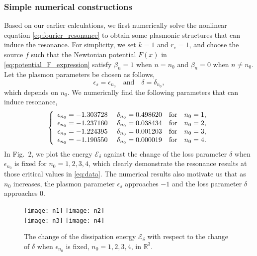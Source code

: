 \documentclass[11pt,reqno,twoside]{amsart}
\theoremstyle{definition}
\theoremstyle{remark}
\numberwithin{equation}{section}
\begin{document}
\subsubsection{Simple numerical constructions}

Based on our earlier calculations, we first numerically solve the nonlinear equation \eqref{eq:fourier_resonance} to obtain some plasmonic structures that can induce the resonance. For simplicity, we set $k=1$ and $r_e=1$, and choose the source $f$ such that the Newtonian potential $F(x)$ in \eqref{eq:potential_F_expression} satisfy $\beta_n=1$ when $n=n_0$ and $\beta_n=0$ when $n\neq n_0$. 
Let the plasmon parameters be chosen as follows,
\begin{equation}
  \epsilon_s=\epsilon_{n_0} \quad \mbox{and} \quad \delta=\delta_{n_0},
\end{equation}
which depends on $n_0$. We numerically find the following parameters that can induce resonance,
\begin{equation}\label{eq:data}
  \left\{
    \begin{array}{ll}
      \epsilon_{n_0}=-1.303728$ \quad $\delta_{n_0}=0.498620 & \mbox{for}\quad n_0=1, \\
      \epsilon_{n_0}=-1.237160$ \quad $\delta_{n_0}=0.038434 & \mbox{for}\quad n_0=2, \\
      \epsilon_{n_0}=-1.224395$ \quad $\delta_{n_0}=0.001203 & \mbox{for}\quad n_0=3, \\
      \epsilon_{n_0}=-1.190550$ \quad $\delta_{n_0}=0.000019 & \mbox{for}\quad n_0=4.
    \end{array}
  \right.
\end{equation}
In Fig.~2, we plot the energy $\mathscr{E}_\delta$ against the change of the loss parameter $\delta$ when $\epsilon_{n_0}$ is fixed for $n_0=1,2,3,4$, which clearly demonstrate the resonance results at those critical values in \eqref{eq:data}. The numerical results also motivate us that as $n_0$ increases, the plasmon parameter $\epsilon_s$ approaches $-1$ and the loss parameter $\delta$ approaches $0$. 

\begin{figure}\label{fig:resoance}
  \centering
 {\texttt{[image: n1]}}
 {\texttt{[image: n2]}\\}
 {\texttt{[image: n3]}}
 {\texttt{[image: n4]}}
  \caption{The change of the dissipation energy $\mathscr{E}_\delta$ with respect to the change of $\delta$ when $\epsilon_{n_0}$ is fixed, $n_0=1,2,3,4$, in $\mathbb{R}^3$. }
\end{figure}
\end{document}
